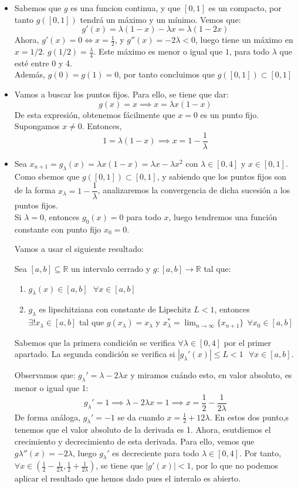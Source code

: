 \documentclass[11pt]{article}
\begin{document}
\begin{itemize}
	\item Sabemos que $g$ es una funcion continua, y que $[0,1]$ es un compacto, por tanto $g([0,1])$ tendrá un máximo y un mínimo. Vemos que:
	\[
	g'(x) = \lambda(1-x) - \lambda x  = \lambda(1-2x)
	\]
	Ahora, $g'(x) = 0 \iff x = \frac{1}{2}$, y $g''(x) = -2 \lambda < 0$, luego tiene un máximo en $x=1/2$. $g(1/2) = \frac{\lambda}{4}$. Este máximo es menor o igual que $1$, para todo $\lambda$ que esté entre 0 y 4.\\
	Además, $g(0) = g(1) = 0$, por tanto concluimos que $g([0,1]) \subset [0,1]$
	
	\item Vamos a buscar los puntos fijos. Para ello, se tiene que dar:
	\[
	g(x) = x \implies x = \lambda x(1-x)
	\]
	De esta expresión, obtenemos fácilmente que $x=0$ es un punto fijo. Supongamos $x\ne0$. Entonces,
	\[
	1 = \lambda(1-x) \implies x = 1- \dfrac{1}{\lambda}
	\]
	
	
	\item Sea $x_{n+1} = g_\lambda(x) = \lambda x(1-x) = \lambda x - \lambda x^2$ con $\lambda \in [0,4]$ y $x \in [0,1]$. Como sbemos que $g([0,1]) \subset [0,1]$, y sabiendo que los puntos fijos son de la forma $x_\lambda = 1 - \dfrac{1}{\lambda}$, analizaremos la convergencia de dicha sucesión a los puntos fijos.\\
	Si $\lambda = 0$, entonces $g_0 (x) = 0$ para todo $x$, luego tendremos una función constante con punto fijo $x_0 = 0$.
	
	Vamos a usar el siguiente resultado:
	
	Sea $[a,b] \subseteq \mathbb R$ un intervalo cerrado y $g:[a,b] \to \mathbb R$ tal que:
	\begin{enumerate}
	\item $g_\lambda(x) \in [a,b] \ \ \ \forall x \in [a,b]$
	\item $g_\lambda$ es lipschitziana con constante de Lipschitz $L<1$, entonces $\exists ! x_\lambda \in [a,b]$ tal que $g(x_\lambda) = x_\lambda$ y $x_\lambda ^* = \lim_{n \to \infty} \{x_{n+1}\} \ \ \forall x_0 \in [a,b]$
\end{enumerate}

Sabemos que la primera condición se verifica $\forall \lambda \in [0,4]$ por el primer apartado. La segunda condición se verifica si $|g_\lambda'(x)| \leq L < 1 \ \ \ \forall x \in [a,b]$.

Observamos que: $g_\lambda'= \lambda - 2\lambda x$ y miramos cuándo esto, en valor absoluto, es menor o igual que 1:
\[
g_\lambda ' = 1 \implies \lambda - 2\lambda x = 1 \implies x = \frac{1}{2} - \frac{1}{2\lambda}
\]
De forma análoga, $g_\lambda' = -1 $ se da cuando $x = \frac{1}{2} + {1}{2\lambda}$.
	En estos dos punto,s tenemos que el valor absoluto de la derivada es 1. Ahora, esutdiemos el crecimiento y decrecimiento de esta derivada. Para ello, vemos que $g\lambda''(x) = -2 \lambda$, luego $g_\lambda'$ es decreciente para todo $\lambda \in [0,4]$. Por tanto, $\forall x \in(\frac{1}{2}-\frac{1}{2\lambda},\frac{1}{2}+\frac{1}{2\lambda})$, se tiene que $|g'(x)| < 1$, por lo que no podemos aplicar el resultado que hemos dado pues el interalo es abierto.\\
	

\end{itemize}
\end{document}
